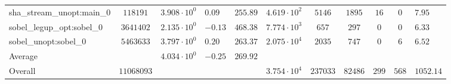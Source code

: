 \begin{tabular}{|l|c|HHc|c|c|c|c|cH|}
sha\_stream\_unopt:main\_0                      & $ 118191   $ & $ 3.908 \cdot 10^{0} $ & $ 0.09  $ & $ 255.89 $ & $ 4.619 \cdot 10^{2}  $ & $ 5146   $ & $ 1895  $ & $ 16  $ & $ 0   $ & $ 7.95    $ \\
sobel\_legup\_opt:sobel\_0                      & $ 3641402  $ & $ 2.135 \cdot 10^{0} $ & $ -0.13 $ & $ 468.38 $ & $ 7.774 \cdot 10^{3}  $ & $ 657    $ & $ 297   $ & $ 0   $ & $ 0   $ & $ 6.33    $ \\
sobel\_unopt:sobel\_0                           & $ 5463633  $ & $ 3.797 \cdot 10^{0} $ & $ 0.20  $ & $ 263.37 $ & $ 2.075 \cdot 10^{4}  $ & $ 2035   $ & $ 747   $ & $ 0   $ & $ 6   $ & $ 6.52    $ \\
\hline
Average                                         & $          $ & $ 4.034 \cdot 10^{0} $ & $ -0.25 $ & $ 269.92 $ & $                     $ & $        $ & $       $ & $     $ & $     $ & $         $ \\
\hline
Overall                                         & $ 11068093 $ & $                    $ & $       $ & $        $ & $ 3.754 \cdot 10^{4}  $ & $ 237033 $ & $ 82486 $ & $ 299 $ & $ 568 $ & $ 1052.14 $ \\
\hline
\end{tabular}
